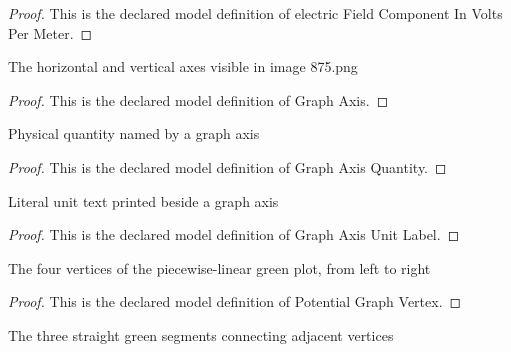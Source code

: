 \begin{proof}
  This is the declared model definition of electric Field Component In Volts Per Meter.
\end{proof}
\begin{definition}
  \label{def:physics:phyx-mini-0875:phyxminiproblems-problemphyxmini0875-graphaxis}
  The horizontal and vertical axes visible in image 875.png
\end{definition}
\begin{proof}
  This is the declared model definition of Graph Axis.
\end{proof}
\begin{definition}
  \label{def:physics:phyx-mini-0875:phyxminiproblems-problemphyxmini0875-graphaxisquantity}
  Physical quantity named by a graph axis
\end{definition}
\begin{proof}
  This is the declared model definition of Graph Axis Quantity.
\end{proof}
\begin{definition}
  \label{def:physics:phyx-mini-0875:phyxminiproblems-problemphyxmini0875-graphaxisunitlabel}
  Literal unit text printed beside a graph axis
\end{definition}
\begin{proof}
  This is the declared model definition of Graph Axis Unit Label.
\end{proof}
\begin{definition}
  \label{def:physics:phyx-mini-0875:phyxminiproblems-problemphyxmini0875-potentialgraphvertex}
  The four vertices of the piecewise-linear green plot, from left to right
\end{definition}
\begin{proof}
  This is the declared model definition of Potential Graph Vertex.
\end{proof}
\begin{definition}
  \label{def:physics:phyx-mini-0875:phyxminiproblems-problemphyxmini0875-potentialgraphsegment}
  The three straight green segments connecting adjacent vertices
\end{definition}
